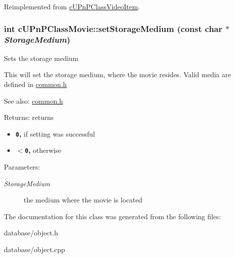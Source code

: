 Reimplemented from \hyperlink{classcUPnPClassVideoItem_3cbda6d87f5a9ff0475a75e76ba19924}{cUPnPClassVideoItem}.\hypertarget{classcUPnPClassMovie_136a1daa4c14c2d7397624eb288c463e}{
\subsubsection[{setStorageMedium}]{\setlength{\rightskip}{0pt plus 5cm}int cUPnPClassMovie::setStorageMedium (const char $\ast$ {\em StorageMedium})}}
\label{classcUPnPClassMovie_136a1daa4c14c2d7397624eb288c463e}


Sets the storage medium

This will set the storage medium, where the movie resides. Valid media are defined in \hyperlink{common_8h-source}{common.h}

\begin{Desc}
\item[See also:]\hyperlink{common_8h-source}{common.h} \end{Desc}
\begin{Desc}
\item[Returns:]returns\begin{itemize}
\item {\bf {\tt 0},} if setting was successful\item {\bf {\tt $<$0},} otherwise \end{itemize}
\end{Desc}
\begin{Desc}
\item[Parameters:]
\begin{description}
\item[{\em StorageMedium}]the medium where the movie is located \end{description}
\end{Desc}


The documentation for this class was generated from the following files:\begin{CompactItemize}
\item 
database/object.h\item 
database/object.cpp\end{CompactItemize}
